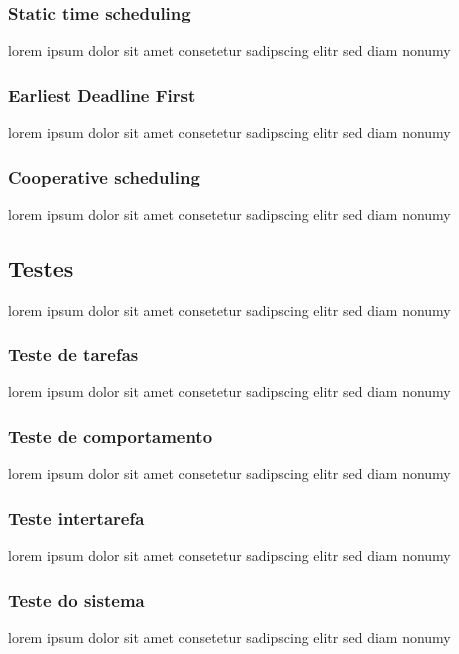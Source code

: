 \subsubsection{Static time scheduling}
lorem ipsum dolor sit amet consetetur sadipscing elitr sed diam nonumy

\subsubsection{Earliest Deadline First}
lorem ipsum dolor sit amet consetetur sadipscing elitr sed diam nonumy

\subsubsection{Cooperative scheduling}
lorem ipsum dolor sit amet consetetur sadipscing elitr sed diam nonumy


\subsection{Testes}
lorem ipsum dolor sit amet consetetur sadipscing elitr sed diam nonumy

\subsubsection{Teste de tarefas}
lorem ipsum dolor sit amet consetetur sadipscing elitr sed diam nonumy

\subsubsection{Teste de comportamento}
lorem ipsum dolor sit amet consetetur sadipscing elitr sed diam nonumy

\subsubsection{Teste intertarefa}
lorem ipsum dolor sit amet consetetur sadipscing elitr sed diam nonumy

\subsubsection{Teste do sistema}
lorem ipsum dolor sit amet consetetur sadipscing elitr sed diam nonumy
